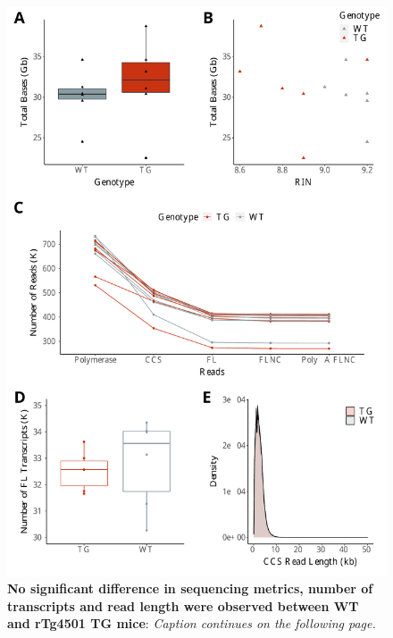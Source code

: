 \begin{figure}[htp]
	\begin{center}
		\includegraphics[page=1,trim={0 0 0 0},clip,scale = 0.55]{Figures/rTg4510WholeTranscriptome.pdf}
	\end{center}
	\captionsetup{width=0.95\textwidth}
	\caption[Sequencing and data processing metrics of rTg4510 mice]%
	{\textbf{No significant difference in sequencing metrics, number of transcripts and read length were observed between WT and rTg4501 TG mice}: \textit{Caption continues on the following page.}}
	\label{fig:rTg4510_sequencing_metrics}
\end{figure}
